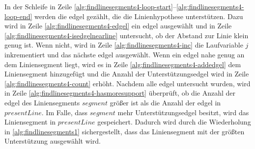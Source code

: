 In der Schleife in Zeile \ref{alg:findlinesegments4-loop-start}--\ref{alg:findlinesegments4-loop-end} werden die
 \gls{edgel} gezählt, die die Linienhypothese unterstützen. Dazu wird in Zeile \ref{alg:findlinesegments4-edgel} ein
 \gls{edgel} ausgewählt und in Zeile \ref{alg:findlinesegments4-isedgelnearline} untersucht, ob der Abstand zur Linie
 klein genug ist. Wenn nicht, wird in Zeile \ref{alg:findlinesegments4-inc} die Laufvariable $j$ inkrementiert und das
 nächste \gls{edgel} ausgewählt. Wenn ein \gls{edgel} nahe genug an dem Liniensegment liegt, wird es in Zeile
 \ref{alg:findlinesegments4-addedgel} dem Liniensegment hinzugefügt und die Anzahl der Unterstützungsedgel wird in
 Zeile \ref{alg:findlinesegments4-count} erhöht. Nachdem alle \gls{edgel} untersucht wurden, wird in Zeile
 \ref{alg:findlinesegments4-hasmoresupport} überprüft, ob die Anzahl der \gls{edgel} des Liniensegments
 $\mathit{segment}$ größer ist als die Anzahl der \gls{edgel} in $\mathit{presentLine}$. Im Falle, dass
 $\mathit{segment}$ mehr Unterstützungsedgel besitzt, wird das Liniensegment in $\mathit{presentLine}$ gespeichert.
 Dadurch wird durch die Wiederholung in \autoref{alg:findlinesegments1} sichergestellt, dass das Liniensegment mit der
 größten Unterstützung ausgewählt wird.
